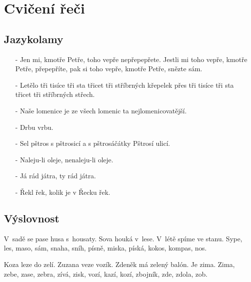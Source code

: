
\section{Cvičení řeči}
\begin{multicols}{2}

\subsection{Jazykolamy}

\begin{itemize}
\itemsep -3pt

\item[-] Jen mi, kmotře Petře, toho vepře nepřepepřete. Jestli mi 
toho vepře, kmotře Petře, přepepříte, pak si toho vepře, kmotře 
Petře, snězte sám.

\item[-] Letělo tři tisíce tři sta třicet tři stříbrných křepelek přes 
tři tisíce tři sta třicet tři stříbrných střech.

\item[-] Naše lomenice je ze všech lomenic ta nejlomenicovatější.

\item[-] Drbu vrbu.

\item[-] Sel pštros s pštrosicí a s pštrosáčátky Pštrosí ulicí.

\item[-] Naleju-li oleje, nenaleju-li oleje.

\item[-] Já rád játra, ty rád játra.

\item[-] Řekl řek, kolik je v Řecku řek.

\end{itemize}

\subsection{Výslovnost}

\begin{description}
\itemsep 0pt

\item[S] V~sadě se pase husa s~housaty. Sova houká v~lese. 
V~létě spíme ve stanu. Sype, les, maso, sám, snaha, sníh,
písně, miska, píská, kokos, kompas, nos.

\item[Z] Koza leze do zelí. Zuzana veze vozík. Zdeněk má
zelený balón. Je zima. Zima, zebe, zase, zebra, zívá, zisk,
vozí, kazí, kozí, zbojník, zde, zdola, zob.


\end{description}
\end{multicols}
